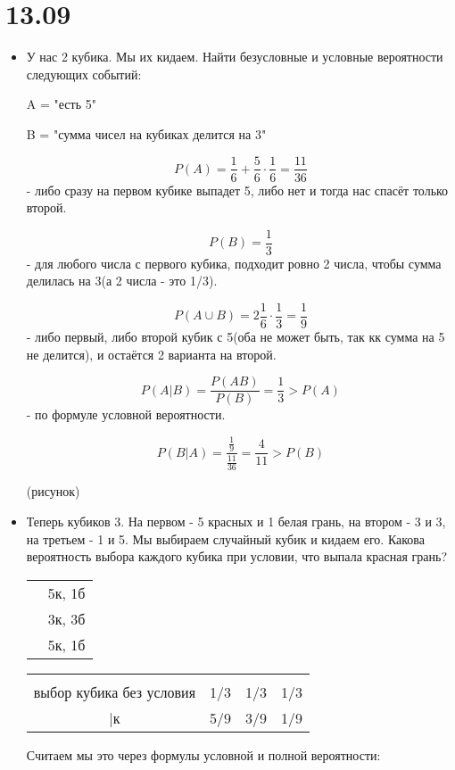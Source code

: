 \section{13.09}

\begin{itemize}
	\item У нас 2 кубика. Мы их кидаем. Найти безусловные и условные вероятности следующих событий: 
	
	A = "есть 5"
	
	B = "сумма чисел на кубиках делится на 3"
	
	\[ P(A) = \frac{1}{6} + \frac{5}{6}\cdot\frac{1}{6} = \frac{11}{36}\] - либо сразу на первом кубике выпадет 5, либо нет и тогда нас спасёт только второй.
	
	\[P(B) = \frac{1}{3}\] - для любого числа с первого кубика, подходит ровно 2 числа, чтобы сумма делилась на 3(а 2 числа - это 1/3).
	
	\[P(A\cup B) = 2 \frac{1}{6}\cdot\frac{1}{3} = \frac{1}{9}\] - либо первый, либо второй кубик с 5(оба не может быть, так кк сумма на 5 не делится), и остаётся 2 варианта на второй.
	
	\[P(A|B) = \frac{P(AB)}{P(B)} = \frac{1}{3} > P(A)\] - по формуле условной вероятности.
	
	\[P(B|A) = \frac{\frac{1}{9}}{\frac{11}{36}} = \frac{4}{11} > P(B) \]
	
	(рисунок)
	
	\item Теперь кубиков 3. На первом - 5 красных и 1 белая грань, на втором - 3 и 3, на третьем - 1 и 5. Мы выбираем случайный кубик и кидаем его. Какова вероятность выбора каждого кубика при условии, что выпала красная грань?
	
	\begin{tabular}{cc}
		\romannumeral 1 & 5к, 1б \\
		\romannumeral 2 & 3к, 3б \\
		\romannumeral 3 & 5к, 1б \\
	\end{tabular}
	
	\begin{tabular}{c|ccc}
	& \romannumeral 1 & \romannumeral 2 & \romannumeral 3 \\
	выбор кубика без условия & 1/3 & 1/3 & 1/3 \\
	|к & 5/9 & 3/9 & 1/9 \\
	\end{tabular}
	
	Считаем мы это через формулы условной и полной вероятности:
	

\end{itemize}
